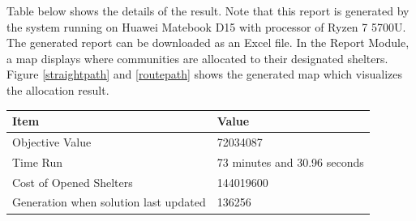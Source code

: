 	
	
	 Table below shows the details of the result. Note that this report is generated by the system running on Huawei Matebook D15 with processor of Ryzen 7 5700U. The generated report can be downloaded as an Excel file. In the Report Module, a map displays where communities are allocated to their designated shelters. Figure \ref{straightpath} and \ref{routepath} shows the generated map which visualizes the allocation result.
	
	\begin{table}[h!]
		\renewcommand{\arraystretch}{1.2} 
		\centering
		\begin{tabular}{ll}
			\hline
			\textbf{Item} & \textbf{Value} \\ \hline
			Objective Value & 72034087 \\ 
			Time Run  & 73 minutes and 30.96 seconds \\ 
			Cost of Opened Shelters & 144019600 \\ 
			Generation when solution last updated & 136256 \\ \hline
		\end{tabular}
	\end{table}
	
